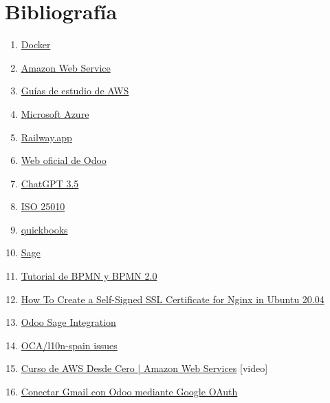 \section{Bibliografía}
\begin{enumerate}
    \item \href{https://www.docker.com}{Docker}
    \item \href{https://aws.amazon.com}{Amazon Web Service}
    \item \href{https://aws.amazon.com/es/training/ramp-up-guides/}{Guías de estudio de AWS}
    \item \href{https://azure.microsoft.com/en-us/}{Microsoft Azure}
    \item \href{https://railway.app}{Railway.app}
    \item \href{https://www.odoo.com/es_ES}{Web oficial de Odoo}
    \item \href{https://chatgpt.com}{ChatGPT 3.5}
    \item \href{https://iso25000.com/index.php/normas-iso-25000/iso-25010}{ISO 25010}
    \item \href{https://quickbooks.intuit.com/eu/}{quickbooks}
    \item \href{https://www.sage.com/es-es/}{Sage}
    \item \href{https://www.lucidchart.com/pages/es/bpmn-bpmn-20-tutorial}{Tutorial de BPMN y BPMN 2.0}
    \item \href{https://www.digitalocean.com/community/tutorials/how-to-create-a-self-signed-ssl-certificate-for-nginx-in-ubuntu-20-04-1}{How To Create a Self-Signed SSL Certificate for Nginx in Ubuntu 20.04}
    \item \href{https://apps.odoo.com/apps/modules/14.0/odoo_sage_integration/}{Odoo Sage Integration}
    \item \href{https://github.com/OCA/l10n-spain/issues}{OCA/l10n-spain issues}
    \item \href{https://www.youtube.com/watch?v=zQyrhjEAqLs}{Curso de AWS Desde Cero | Amazon Web Services} [video]
    \item \href{https://www.odoo.com/documentation/15.0/es/applications/general/email_communication/google_oauth.html}{Conectar Gmail con Odoo mediante Google OAuth}    
\end{enumerate}